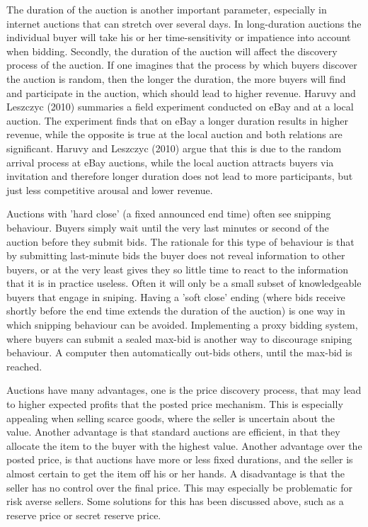 \documentclass[a4paper,12pt]{article}
\begin{document}
	The duration of the auction is another important parameter, especially in internet auctions that can stretch over several days. In long-duration auctions the individual buyer will take his or her time-sensitivity or impatience into account when bidding. Secondly, the duration of the auction will affect the discovery process of the auction. If one imagines that the process by which buyers discover the auction is random, then the longer the duration, the more buyers will find and participate in the auction, which should lead to higher revenue. Haruvy and Leszczyc (2010) summaries a field experiment conducted on eBay and at a local auction. The experiment finds that on eBay a longer duration results in higher revenue, while the opposite is true at the local auction and both relations are significant. Haruvy and Leszczyc (2010) argue that this is due to the random arrival process at eBay auctions, while the local auction attracts buyers via invitation and therefore longer duration does not lead to more participants, but just less competitive arousal and lower revenue. 

	Auctions with 'hard close' (a fixed announced end time) often see snipping behaviour. Buyers simply wait until the very last minutes or second of the auction before they submit bids. The rationale for this type of behaviour is that by submitting last-minute bids the buyer does not reveal information to other buyers, or at the very least gives they so little time to react to the information that it is in practice useless. Often it will only be a small subset of knowledgeable buyers that engage in sniping. Having a 'soft close' ending (where bids receive shortly before the end time extends the duration of the auction) is one way in which snipping behaviour can be avoided. Implementing a proxy bidding system, where buyers can submit a sealed max-bid is another way to discourage sniping behaviour. A computer then automatically out-bids others, until the max-bid is reached.

	Auctions have many advantages, one is the price discovery process, that may lead to higher expected profits that the posted price mechanism. This is especially appealing when selling scarce goods, where the seller is uncertain about the value. Another advantage is that standard auctions are efficient, in that they allocate the item to the buyer with the highest value. Another advantage over the posted price, is that auctions have more or less fixed durations, and the seller is almost certain to get the item off his or her hands. A disadvantage is that the seller has no control over the final price. This may especially be problematic for risk averse sellers. Some solutions for this has been discussed above, such as a reserve price or secret reserve price.
\end{document}

